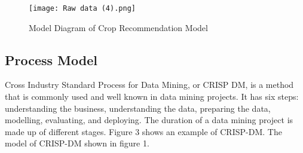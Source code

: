 \begin{figure}[h]
    \centering
    \texttt{[image: Raw data (4).png]}
    \caption{Model Diagram of Crop Recommendation Model}
    \label{fig:my_label}
    
\end{figure}


\subsection{Process Model}

 





 


Cross Industry Standard Process for Data Mining, or CRISP DM, is a method that is commonly used and well known in data mining projects. It has six steps: understanding the business, understanding the data, preparing the data, modelling, evaluating, and deploying. The duration of a data mining project is made up of different stages. Figure 3 shows an example of CRISP-DM. The model of CRISP-DM shown in figure 1.


